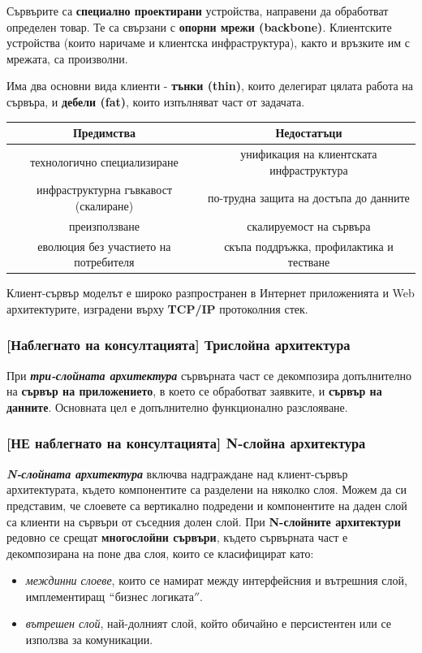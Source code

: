 \documentclass{scrartcl}
\begin{document}
\begin{FlushLeft}
Сървърите са \textbf{специално проектирани} устройства, направени да обработват определен товар. Те са свързани с \textbf{опорни мрежи (backbone)}.
Клиентските устройства (които наричаме и клиентска инфраструктура), както и връзките им с мрежата, са произволни.

Има два основни вида клиенти - \textbf{тънки (thin)}, които делегират цялата работа на сървъра, и \textbf{дебели (fat)}, които изпълняват част от задачата.

\begin{center}
\begin{tabular}{ |c|c| } 
    \hline
    Предимства & Недостатъци \\
    \hline
    технологично специализиране & унификация на клиентската инфраструктура \\
    \hline
    инфраструктурна гъвкавост (скалиране) & по-трудна защита на достъпа до данните \\
    \hline
    преизползване & скалируемост на сървъра \\
    \hline
    еволюция без участието на потребителя & скъпа поддръжка, профилактика и тестване \\
    \hline
\end{tabular}
\end{center}

Клиент-сървър моделът е широко разпространен в Интернет приложенията и Web архитектурите, изградени върху \textbf{TCP/IP} протоколния стек.

\subsubsection{[Наблегнато на консултацията] Трислойна  архитектура}
При \textbf{\textit{три-слойната архитектура}} сървърната част се декомпозира допълнително 
на \textbf{сървър на приложението}, в което се обработват заявките, и \textbf{сървър на данните}.
Основната цел е допълнително функционално разслояване.

\subsubsection{[НЕ наблегнато на консултацията] N-слойна архитектура}
\textbf{\textit{N-слойната архитектура}} включва надграждане над клиент-сървър архитектурата, където компонентите са разделени на няколко слоя.
Можем да си представим, че слоевете са вертикално подредени и компонентите на даден слой са клиенти на сървъри от съседния долен слой.
\bigbreak
При \textbf{N-слойните архитектури} редовно се срещат \textbf{многослойни сървъри}, където сървърната част е декомпозирана на поне два слоя, които се класифицират като:
\begin{itemize}
    \item \textit{междинни слоеве}, които се намират между интерфейсния и вътрешния слой, имплементиращ $``$бизнес логиката$''$.
    \item \textit{вътрешен слой}, най-долният слой, който обичайно е персистентен или се използва за комуникации. 
\end{itemize}


\end{FlushLeft}
\end{document}
